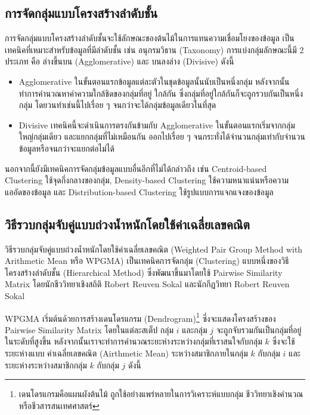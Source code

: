 \subsection{การจัดกลุ่มแบบโครงสร้างลำดับชั้น}
\label{ssec:hierar_clustering}

การจัดกลุ่มแบบโครงสร้างลำดับชั้นจะใช้ลักษณะของต้นไม้ในการแทนความเชื่อมโยงของข้อมูล เป็นเทคนิคที่เหมาะสำหรับข้อมูลที่มีลำดับชั้น เช่น 
อนุกรมวิธาน (Taxonomy) การแบ่งกลุ่มลักษณะนี้มี 2 ประเภท คือ ล่างขึ้นบน (Agglomerative) และ บนลงล่าง (Divisive) ดังนี้ 

\begin{itemize}
    \item Agglomerative ในขั้นตอนแรกข้อมูลแต่ละตัวในชุดข้อมูลนั้นนับเป็นหนึ่งกลุ่ม หลังจากนั้นทำการคำนวณหาค่าความใกล้ชิดของกลุ่มที่อยู่%
    ใกล้กัน ซึ่งกลุ่มที่อยู่ใกล้กันก็จะถูกรวบกันเป็นหนึ่งกลุ่ม โดยวนทำเช่นนี้ไปเรื่อย ๆ จนกว่าจะได้กลุ่มข้อมูลเดียวในที่สุด
    
    \item Divisive เทคนิคนี้จะดำเนินการตรงกันข้ามกับ Agglomerative ในขั้นตอนแรกเริ่มจากกลุ่มใหญ่กลุ่มเดียว และแยกกลุ่มที่ไม่เหมือนกัน%
    ออกไปเรื่อย ๆ จนกระทั่งได้จำนวนกลุ่มเท่ากับจำนวนข้อมูลหรือจนกว่าจะแยกต่อไม่ได้ 
\end{itemize}

นอกจากนี้ยังมีเทคนิคการจัดกลุ่มข้อมูลแบบอื่นอีกที่ไม่ได้กล่าวถึง เช่น Centroid-based Clustering ใช้จุดกึ่งกลางของกลุ่ม, Density-based 
Clustering ใช้ความหนาแน่นหรือความแออัดของข้อมูล และ Distribution-based Clustering ใช้รูปแบบการแจกแจงของข้อมูล

\subsection{วิธีรวบกลุ่มจับคู่แบบถ่วงน้ำหนักโดยใช้ค่าเฉลี่ยเลขคณิต}
\label{ssec:wpgma}

วิธีรวบกลุ่มจับคู่แบบถ่วงน้ำหนักโดยใช้ค่าเฉลี่ยเลขคณิต (Weighted Pair Group Method with Arithmetic Mean หรือ WPGMA) 
เป็นเทคนิคการจัดกลุ่ม (Clustering) แบบหนึ่งของวิธีโครงสร้างลำดับชั้น (Hierarchical Method) ซึ่งพัฒนาขึ้นมาโดยใช้ Pairwise 
Similarity Matrix\autocite{sokal1958} โดยนักชีววิทยาเชิงสถิติ Robert Reuven Sokal และนักกีฏวิทยา Robert Reuven Sokal

WPGMA เริ่มต้นด้วยการสร้างเดนโดรแกรม (Dendrogram)\footnote{เดนโดรแกรมคือแผนผังต้นไม้ ถูกใช้อย่างแพร่หลายในการวิเคราะห์แบบกลุ่ม
ชีววิทยาเชิงคำนวณหรือชีวสารสนเทศศาสตร์} ซึ่งจะแสดงโครงสร้างของ Pairwise Similarity Matrix โดยในแต่ละสเต็ป กลุ่ม $i$ และกลุ่ม 
$j$ จะถูกจับรวมกันเป็นกลุ่มที่อยู่ในระดับที่สูงขึ้น หลังจากนั้นเราจะทำการคำนวณระยะห่างระหว่างกลุ่มที่เราสนใจกับกลุ่ม $k$ ซึ่งจะใช้ระยะห่างแบบ%
ค่าเฉลี่ยเลขคณิต (Airthmetic Mean) ระหว่างสมาชิกภายในกลุ่ม $k$ กับกลุ่ม $i$ และระยะห่างระหว่างสมาชิกกลุ่ม $k$ กับกลุ่ม $j$ ดังนี้

